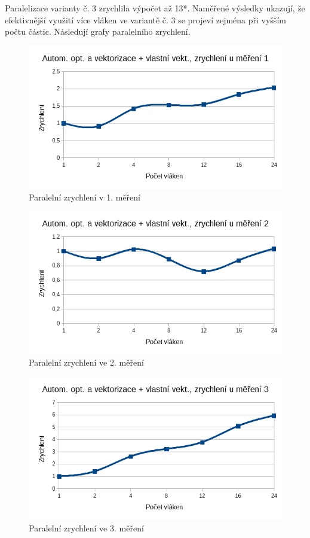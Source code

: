 \documentclass[12pt]{article}
\begin{document}
Paralelizace varianty č. 3 zrychlila výpočet až 13*. 
Naměřené výsledky ukazují, že efektivnější využití více vláken ve variantě č. 3 se projeví zejména při vyšším počtu částic.
Následují grafy paralelního zrychlení.

\begin{figure}[H]
  \begin{center}
     \includegraphics[width=12cm]{images/ssef1acc.png}
    \caption{Paralelní zrychlení v 1. měření} 
  \end{center}
\end{figure}

\begin{figure}[H]
  \begin{center}
     \includegraphics[width=12cm]{images/ssef2acc.png}
    \caption{Paralelní zrychlení ve 2. měření} 
  \end{center}
\end{figure}

\begin{figure}[H]
  \begin{center}
     \includegraphics[width=12cm]{images/ssef3acc.png}
    \caption{Paralelní zrychlení ve 3. měření} 
  \end{center}
\end{figure}
\end{document}
